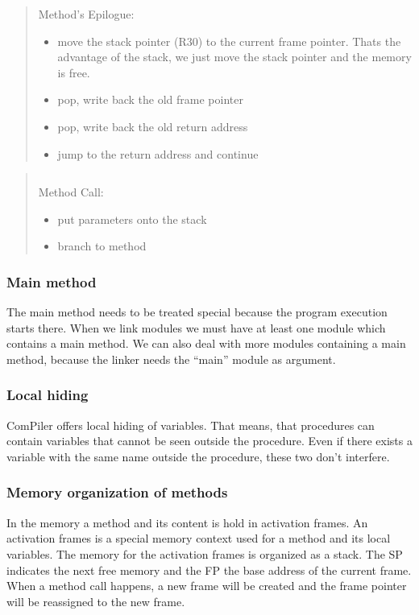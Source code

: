 \begin{quote}
Method's Epilogue: \\
\begin{itemize}
  \item move the stack pointer (R30) to the current frame pointer. Thats the advantage of the stack, we just move the stack pointer and the
  memory is free.
  \item pop, write back the old frame pointer
  \item pop, write back the old return address
  \item jump to the return address and continue
\end{itemize}
\end{quote}
\begin{quote}
\begin{verbatim}

\end{verbatim}
Method Call: \\
\begin{itemize}
  \item put parameters onto the stack
  \item branch to method
\end{itemize}

\end{quote}

\subsubsection{Main method}
The main method needs to be treated special because the program execution starts there. When we link modules we must have at least one
module which contains a main method. We can also deal with more modules containing a main method, because the linker needs the ``main''
module as argument. 

\subsubsection{Local hiding}
\label{label_local_hiding}
ComPiler offers local hiding of variables. That means, that procedures can
contain variables that cannot be seen outside the procedure. Even if there
exists a variable with the same name outside the procedure, these two don't
interfere.

\subsubsection{Memory organization of methods}
In the memory a method and its content is hold in activation frames. An activation frames is a special memory context used for a
method and its local variables.
The memory for the activation frames is organized as a stack. The SP indicates the next free memory and the FP the base address of the
current frame. When a method call happens, a new frame will be created and the frame pointer will be reassigned to the new frame. 


